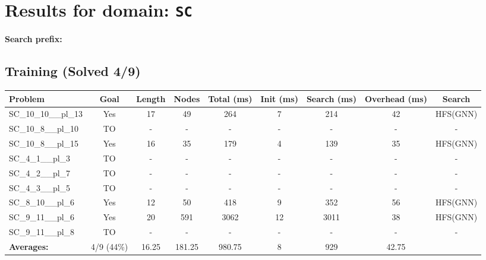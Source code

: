 \documentclass{article}
\begin{document}
\section*{Results for domain: \texttt{SC}}
\textbf{Search prefix:} 
\\[0.5cm]
\subsection*{Training (Solved 4/9)}
\begin{tabular}{lcccccccc}
\toprule
Problem & Goal & Length & Nodes & Total (ms) & Init (ms) & Search (ms) & Overhead (ms) & Search \\
\midrule
SC\_10\_10\_\_pl\_13 & Yes & 17 & 49 & 264 & 7 & 214 & 42 & HFS(GNN) \\
SC\_10\_8\_\_pl\_10 & TO & - & - & - & - & - & - & - \\
SC\_10\_8\_\_pl\_15 & Yes & 16 & 35 & 179 & 4 & 139 & 35 & HFS(GNN) \\
SC\_4\_1\_\_pl\_3 & TO & - & - & - & - & - & - & - \\
SC\_4\_2\_\_pl\_7 & TO & - & - & - & - & - & - & - \\
SC\_4\_3\_\_pl\_5 & TO & - & - & - & - & - & - & - \\
SC\_8\_10\_\_pl\_6 & Yes & 12 & 50 & 418 & 9 & 352 & 56 & HFS(GNN) \\
SC\_9\_11\_\_pl\_6 & Yes & 20 & 591 & 3062 & 12 & 3011 & 38 & HFS(GNN) \\
SC\_9\_11\_\_pl\_8 & TO & - & - & - & - & - & - & - \\
\textbf{Averages:} & 4/9 (44\%) & 16.25 & 181.25 & 980.75 & 8 & 929 & 42.75 & \\
\bottomrule
\end{tabular}
\\[0.7cm]
\end{document}
